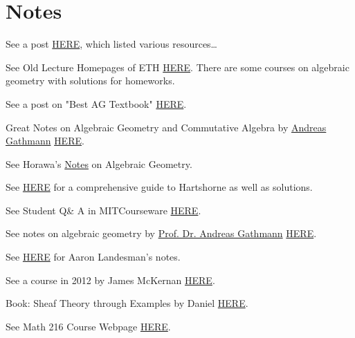 \section{Notes}

See a post \href{https://math.stackexchange.com/questions/1678780/hartshorne-or-vakils-notes}{HERE}, which listed various resources\dots

See Old Lecture Homepages of ETH \href{https://www2.math.ethz.ch/education/bachelor/lectures.html}{HERE}. There are some courses on algebraic geometry with solutions for homeworks.

See a post on "Best AG Textbook" \href{https://math.stackexchange.com/questions/998/best-algebraic-geometry-text-book-other-than-hartshorne#:~:text=Before%20Hartshorne%27s%20book%20there%20was,and%20the%20sheaf%20of%20differentials.}{HERE}.

Great Notes on Algebraic Geometry and Commutative Algebra by \href{https://math.rptu.de/ags/agag/personen/leitung/gathmann/}{Andreas Gathmann} \href{https://agag-gathmann.math.rptu.de/de/notes.php}{HERE}.

See Horawa's \href{https://people.maths.ox.ac.uk/horawa/notes.html}{Notes} on Algebraic Geometry.

See \href{https://mathbooknotes.fandom.com/wiki/Hartshorne_-_Algebraic_Geometry}{HERE} for a comprehensive guide to Hartshorne as well as solutions.

See Student Q\& A in MITCourseware \href{https://ocw.mit.edu/courses/18-726-algebraic-geometry-spring-2009/pages/student-q-a/}{HERE}.

See notes on algebraic geometry by \href{https://math.rptu.de/en/wgs/agag/people/head/gathmann/}{Prof. Dr. Andreas Gathmann} \href{https://agag-gathmann.math.rptu.de/en/alggeom.php}{HERE}.


See \href{https://people.math.harvard.edu/~landesman/notes.html}{HERE} for Aaron Landesman's notes.

See a course in 2012 by James McKernan \href{https://math.mit.edu/~mckernan/Teaching/11-12/Spring/18.726/18.726.html}{HERE}.

Book: Sheaf Theory through Examples by Daniel \href{https://direct.mit.edu/books/oa-monograph/5460/Sheaf-Theory-through-Examples#}{HERE}.

See Math 216 Course Webpage \href{https://math216.wordpress.com}{HERE}.